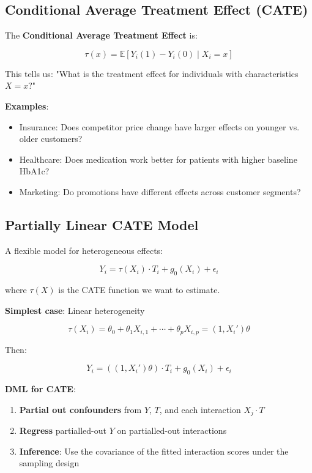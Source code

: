 \subsection{Conditional Average Treatment Effect
(CATE)}\label{_conditional_average_treatment_effect_cate}

The \textbf{Conditional Average Treatment Effect} is:

\[\tau(x) = \mathbb{E}[Y_i(1) - Y_i(0) \mid X_i = x]\]

This tells us: "What is the treatment effect for individuals with
characteristics \(X = x\)?"

\textbf{Examples}:

\begin{itemize}
\item
  Insurance: Does competitor price change have larger effects on younger
  vs. older customers?
\item
  Healthcare: Does medication work better for patients with higher
  baseline HbA1c?
\item
  Marketing: Do promotions have different effects across customer
  segments?
\end{itemize}

\subsection{Partially Linear CATE
Model}\label{_partially_linear_cate_model}

A flexible model for heterogeneous effects:

\[Y_i = \tau(X_i) \cdot T_i + g_0(X_i) + \epsilon_i\]

where \(\tau(X)\) is the CATE function we want to estimate.

\textbf{Simplest case}: Linear heterogeneity

\[\tau(X_i) = \theta_0 + \theta_1 X_{i,1} + \cdots + \theta_p X_{i,p} = (1,X_i')\theta\]

Then:

\[Y_i = ((1,X_i')\theta) \cdot T_i + g_0(X_i) + \epsilon_i\]

\textbf{DML for CATE}:

\begin{enumerate}
\def\labelenumi{\arabic{enumi}.}
\item
  \textbf{Partial out confounders} from \(Y\), \(T\), and each
  interaction \(X_j \cdot T\)
\item
  \textbf{Regress} partialled-out \(Y\) on partialled-out interactions
\item
  \textbf{Inference}: Use the covariance of the fitted interaction scores under the sampling design
\end{enumerate}

